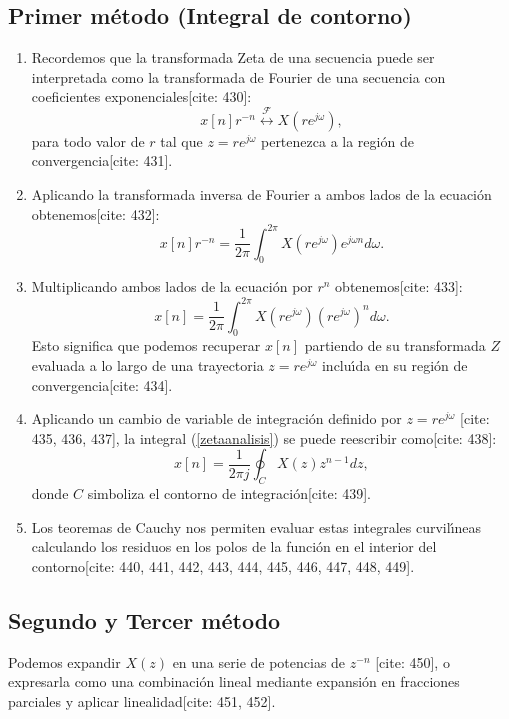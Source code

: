 \documentclass[11pt,a4paper,openany]{book}
\begin{document}
\subsection{Primer m\'{e}todo (Integral de contorno)}
\begin{enumerate}
	\item Recordemos que la transformada Zeta de una secuencia puede ser interpretada como la transformada de Fourier de una secuencia con coeficientes exponenciales[cite: 430]:
	\begin{equation}
		x[n] r^{-n} \stackrel{\mathcal{F}}{\longleftrightarrow} X(r e^{j \omega}),
	\end{equation}
	para todo valor de $r$ tal que $z = r e^{j \omega}$ pertenezca a la regi\'{o}n de convergencia[cite: 431].
	\item Aplicando la transformada inversa de Fourier a ambos lados de la ecuaci\'{o}n obtenemos[cite: 432]:
	\begin{equation}
		x[n] r^{-n} = \frac{1}{2 \pi} \int^{2 \pi}_{0} X(r e^{j \omega}) e^{j \omega n} d \omega.
	\end{equation}
	\item Multiplicando ambos lados de la ecuaci\'{o}n por $r^{n}$ obtenemos[cite: 433]:
	\begin{equation} \label{zetaanalisis}
		x[n] = \frac{1}{2 \pi} \int^{2 \pi}_{0} X(r e^{j \omega}) (r e^{j \omega})^{n} d \omega.
	\end{equation}
	Esto significa que podemos recuperar $x[n]$ partiendo de su transformada $Z$ evaluada a lo largo de una trayectoria $z=r e^{j \omega}$ inclu\'{\i}da en su regi\'{o}n de convergencia[cite: 434].
	\item Aplicando un cambio de variable de integraci\'{o}n definido por $z = r e^{j \omega}$ [cite: 435, 436, 437], la integral (\ref{zetaanalisis}) se puede reescribir como[cite: 438]:
	\begin{equation}
		x[n] = \frac{1}{2 \pi j} \oint_{C} X(z) z^{n-1} dz,
	\end{equation}
	donde $C$ simboliza el contorno de integraci\'{o}n[cite: 439].
	\item Los teoremas de Cauchy nos permiten evaluar estas integrales curvil\'{\i}neas calculando los residuos en los polos de la función en el interior del contorno[cite: 440, 441, 442, 443, 444, 445, 446, 447, 448, 449].
\end{enumerate}

\subsection{Segundo y Tercer m\'{e}todo}
Podemos expandir $X(z)$ en una serie de potencias de $z^{-n}$ [cite: 450], o expresarla como una combinaci\'{o}n lineal mediante expansión en fracciones parciales y aplicar linealidad[cite: 451, 452].
\end{document}

